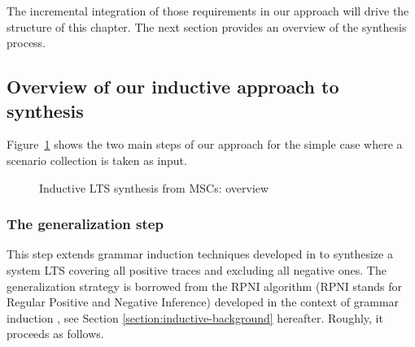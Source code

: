 The incremental integration of those requirements in our approach will drive the structure of this chapter. The next section provides an overview of the synthesis process.


\subsection{Overview of our inductive approach to synthesis\label{subsection:inductive-synthesis-approach}}

Figure~\ref{image:inductive-synthesis-overview} shows the two main steps of our approach for the simple case where a scenario collection is taken as input. 

\begin{figure}
\centering
{}
\caption{Inductive LTS synthesis from MSCs: overview\label{image:inductive-synthesis-overview}}
\end{figure}

\subsubsection*{The generalization step}

This step extends grammar induction techniques developed in \cite{Oncina:1992} to synthesize a system LTS covering all positive traces and excluding all negative ones. The generalization strategy is borrowed from the RPNI algorithm (RPNI stands for Regular Positive and Negative Inference) developed in the context of grammar induction \cite{Oncina:1992}, see Section \ref{section:inductive-background} hereafter. Roughly, it proceeds as follows.

